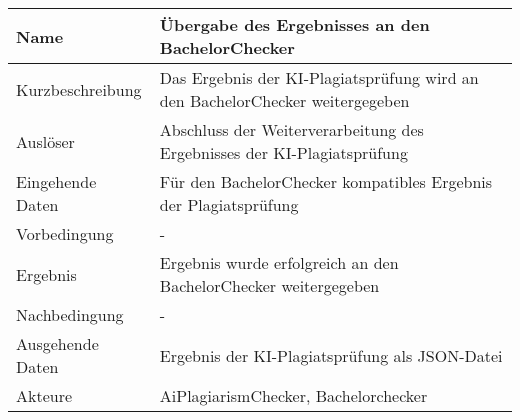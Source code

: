 \begin{tabularx}{\textwidth}{|l|X|}
    \hline
    \textbf{Name} & \textbf{Übergabe des Ergebnisses an den BachelorChecker} \\
    \hline
    Kurzbeschreibung & Das Ergebnis der KI-Plagiatsprüfung wird an den BachelorChecker weitergegeben \\
    \hline
    Auslöser & Abschluss der Weiterverarbeitung des Ergebnisses der KI-Plagiatsprüfung \\
    \hline
    Eingehende Daten & Für den BachelorChecker kompatibles Ergebnis der Plagiatsprüfung \\
    \hline
    Vorbedingung & - \\
    \hline
    Ergebnis & Ergebnis wurde erfolgreich an den BachelorChecker weitergegeben \\
    \hline
    Nachbedingung & - \\
    \hline
    Ausgehende Daten & Ergebnis der KI-Plagiatsprüfung als JSON-Datei \\
    \hline
    Akteure & AiPlagiarismChecker, Bachelorchecker \\
    \hline
\end{tabularx}
